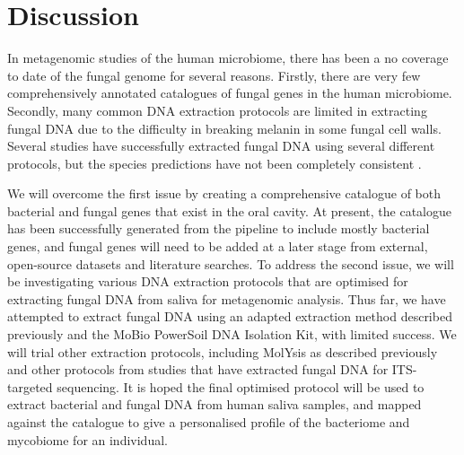 \documentclass[a4paper]{article}
\begin{document}
\section{Discussion}
In metagenomic studies of the human microbiome, there has been a no coverage to date of the fungal genome for several reasons. Firstly, there are very few comprehensively annotated catalogues of fungal genes in the human microbiome. Secondly, many common DNA extraction protocols are limited in extracting fungal DNA due to the difficulty in breaking melanin in some fungal cell walls. Several studies have successfully extracted fungal DNA using several different protocols, but the species predictions have not been completely consistent \cite{vesty_evaluating_2017}.

We will overcome the first issue by creating a comprehensive catalogue of both bacterial and fungal genes that exist in the oral cavity. At present, the catalogue has been successfully generated from the pipeline to include mostly bacterial genes, and fungal genes will need to be added at a later stage from external, open-source datasets and literature searches. To address the second issue, we will be investigating various DNA extraction protocols that are optimised for extracting fungal DNA from saliva for metagenomic analysis. Thus far, we have attempted to extract fungal DNA using an adapted extraction method described previously \cite{furet_comparative_2009} and the MoBio PowerSoil DNA Isolation Kit, with limited success. We will  trial other extraction protocols, including MolYsis as described previously \cite{mccann_evaluation_2014} and other protocols from studies that have extracted fungal DNA for ITS-targeted sequencing. It is hoped the final optimised protocol will be used to extract bacterial and fungal DNA from human saliva samples, and mapped against the catalogue to give a personalised profile of the bacteriome and mycobiome for an individual.
\end{document}
